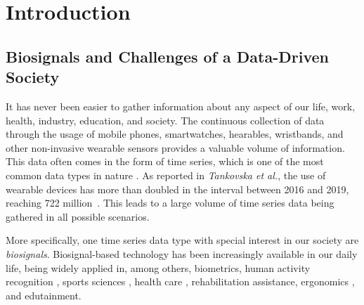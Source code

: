 
%

\chapter{Introduction}
\label{cha:introduction}



\section{Biosignals and Challenges of a Data-Driven Society} 
\label{sub:motivation1}


It has never been easier to gather information about any aspect of our life, work, health, industry, education, and society. The continuous collection of data through the usage of mobile phones, smartwatches, hearables, wristbands, and other non-invasive wearable sensors provides a valuable volume of information. This data often comes in the form of time series, which is one of the most common data types in nature \cite{puttinghuman}. As reported in \textit{Tankovska et al.}, the use of wearable devices has more than doubled in the interval between 2016 and 2019, reaching 722 million~\cite{tankovska_23_2020}. This leads to a large volume of time series data being gathered in all possible scenarios. 

More specifically, one time series data type with special interest in our society are \textit{biosignals}. Biosignal-based technology has been increasingly available in our daily life, being widely applied in, among others, biometrics, human activity recognition \cite{cpd_har_1, cpd_har_2, review_1}, sports sciences \cite{li20gait, liu22activityduration, mendes2016sensor, ji2018real, howard2016survey, mcnab2011iphone, howard2016wireless, yuji2005mems, espinosa2015inertial, ohgi2002microcomputer}, health care \cite{cpd_medical_1, cpd_medical_2, cpd_medical_3, cpd_medical_4, dataset6, dataset7}, rehabilitation assistance, ergonomics \cite{antonio, sara}, and edutainment.

